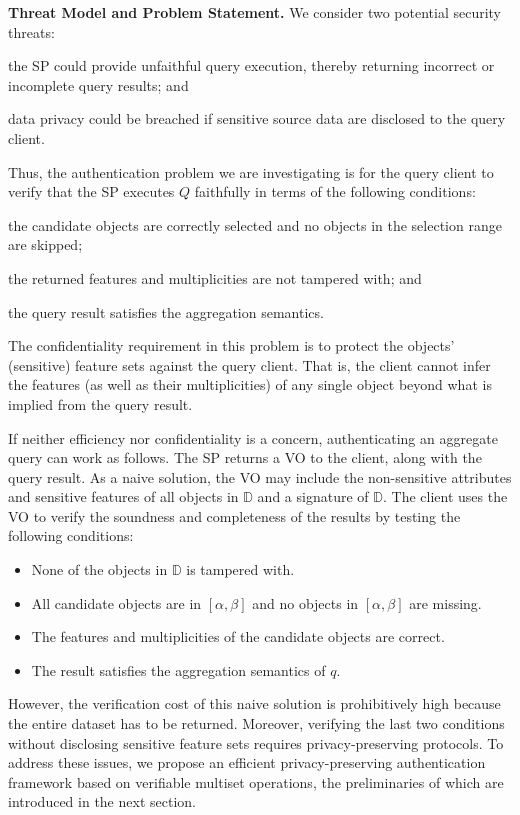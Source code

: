 \textbf{Threat Model and Problem Statement.} We consider two potential security threats:
\begin{inlineenum}
\item the SP could provide unfaithful query execution, thereby returning incorrect or incomplete query results; and
\item data privacy could be breached if sensitive source data are disclosed to the query client.
\end{inlineenum}
Thus, the authentication problem we are investigating is for the query client to verify that the SP executes $Q$ faithfully in terms of the following conditions:
\begin{inlineenum}
\item the candidate objects are correctly selected and no objects in the selection range are skipped;
\item the returned features and multiplicities are not tampered with; and
\item the query result satisfies the aggregation semantics.
\end{inlineenum}
The confidentiality requirement in this problem is to protect the objects' (sensitive) feature sets against the query client. That is, the client cannot infer the features (as well as their multiplicities) of any single object beyond what is implied from the query result.

If neither efficiency nor confidentiality is a concern, authenticating an aggregate query can work as follows. The SP returns a VO to the client, along with the query result. As a naive solution, the VO may include the non-sensitive attributes and sensitive features of all objects in $\mathbb{D}$ and a signature of $\mathbb{D}$. The client uses the VO to verify the soundness and completeness of the results by testing the following conditions:
\begin{itemize}
  \item None of the objects in $\mathbb{D}$ is tampered with.
  \item All candidate objects are in $[\alpha, \beta]$ and no objects in $[\alpha, \beta]$ are missing.
  \item The features and multiplicities of the candidate objects are correct.
  \item The result satisfies the aggregation semantics of $q$.
\end{itemize}

However, the verification cost of this naive solution is prohibitively high because the entire dataset has to be returned. Moreover, verifying the last two conditions without disclosing sensitive feature sets requires privacy-preserving protocols. To address these issues, we propose an efficient privacy-preserving authentication framework based on verifiable multiset operations, the preliminaries of which are introduced in the next section.

